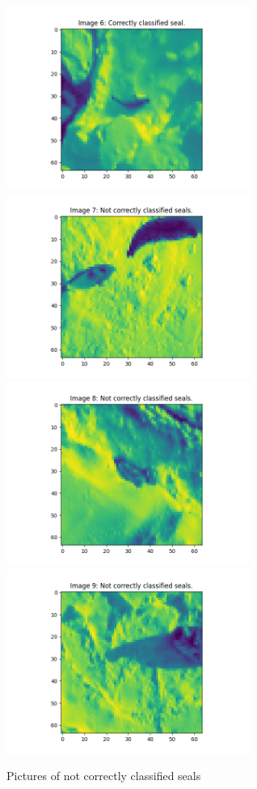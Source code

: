 \documentclass[12pt, letterpaper]{article}
\begin{document}
      \begin{figure}[H]
        \caption{Pictures of not correctly classified seals}
        \centering
        \includegraphics[width=8cm]{notcorr6}
        \includegraphics[width=8cm]{notcorr7}
        \includegraphics[width=8cm]{notcorr8}
        \includegraphics[width=8cm]{notcorr9}

\end{figure}
\end{document}
